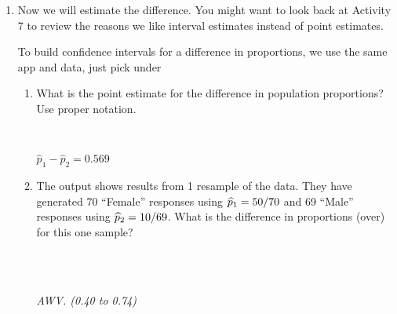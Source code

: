 \begin{enumerate}
\begin{enumerate}
\begin{key}
      \\ {\it Reject $H_0$.}\\
\end{key}
       State your conclusion about $H_0$ in the context of this
       situation. Be as specific   as possible about the true
       proportions overestimating their weight.
\begin{students}
 \ \   \vspace*{2cm}\\
\end{students}
\begin{key}
   {\it We conclude that when people are wrong about their weight, a
     much larger proportion of women than men say they are over,
     rather than under weight.}
\end{key}
\end{enumerate}

\item Now we will estimate the difference.  You might want to look
   back at Activity 7 to review the reasons we like interval estimates
   instead of point estimates.

   To build confidence intervals for a difference in proportions, we
   use the same app and data, just pick  under 

    \begin{enumerate}
      \item    \label{phatDiff} What is the point estimate for the
       difference in population    proportions? Use proper notation.
\begin{students}
 \ \   \vspace*{1cm}\\
\end{students}
\begin{key}
   $\widehat{p}_1  - \widehat{p}_2 =    0.569$
\end{key}

\item The output shows results from 1 resample of the data.
       They have generated  70 ``Female'' responses using $\widehat{p}_1 =
       50/70$ and 69 ``Male'' responses using $\widehat{p}_2 = 10/69$. What
       is the difference in proportions (over) for this one sample?
\begin{students}
 \ \   \vspace*{1cm}\\
\end{students}
\begin{key}
   \\ {\it AWV. (0.40 to 0.74) }  
\end{key}


\end{enumerate}
\end{enumerate}
